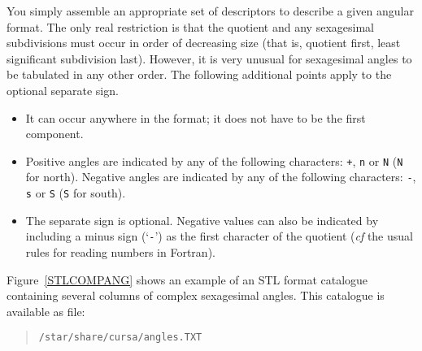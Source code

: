 \documentclass[twoside,11pt]{article}
\renewcommand{\_}{\texttt{\symbol{95}}}
\begin{document}
You simply assemble an appropriate set of descriptors to describe a
given angular format.  The only real restriction is that the quotient
and any sexagesimal subdivisions must occur in order of decreasing size
(that is, quotient first, least significant subdivision last).  However,
it is very unusual for sexagesimal angles to be tabulated in any other
order.  The following additional points apply to the optional separate
sign.

\begin{itemize}

  \item It can occur anywhere in the format; it does not have to be
   the first component.

  \item Positive angles are indicated by any of the following
   characters: {\tt +}, {\tt n} or {\tt N} ({\tt N} for north).
   Negative angles are indicated by any of the following characters:
   {\tt -}, {\tt s} or {\tt S} ({\tt S} for south).

  \item The separate sign is optional.  Negative values can also be
   indicated by including a minus sign (`{\tt -}') as the first
   character of the quotient ({\it cf}\/ the usual rules for reading
   numbers in Fortran).

\end{itemize}

Figure~\ref{STLCOMPANG} shows an example of an STL format catalogue
containing several columns of complex sexagesimal angles.  This
catalogue is available as file:

\begin{verse} 
{\tt /star/share/cursa/angles.TXT}
\end{verse}
\end{document}
